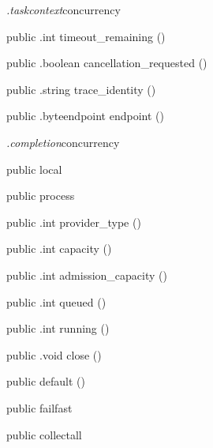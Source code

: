 \begin{CrexxClass}{\textit{.taskcontext}}{concurrency}
\begin{Members}
    \Method
      {public}
      {.int}
      {timeout\_remaining}
      {()}

    \Method
      {public}
      {.boolean}
      {cancellation\_requested}
      {()}

    \Method
      {public}
      {.string}
      {trace\_identity}
      {()}

    \Method
      {public}
      {.byteendpoint}
      {endpoint}
      {()}

  \end{Members}
\end{CrexxClass}

\begin{CrexxClass}{\textit{.completion}}{concurrency}

  \begin{Hierarchy}
  \end{Hierarchy}

  \begin{Members}

    \Factory
      {public}
      {local}
      {}

    \Factory
      {public}
      {process}
      {}

    \Method
      {public}
      {.int}
      {provider\_type}
      {()}

    \Method
      {public}
      {.int}
      {capacity}
      {()}

    \Method
      {public}
      {.int}
      {admission\_capacity}
      {()}

    \Method
      {public}
      {.int}
      {queued}
      {()}

    \Method
      {public}
      {.int}
      {running}
      {()}

    \Method
      {public}
      {.void}
      {close}
      {()}

    \Factory
      {public}
      {default}
      {()}

    \Factory
      {public}
      {failfast}
      {}

    \Factory
      {public}
      {collectall}
      {}


\end{Members}
\end{CrexxClass}
